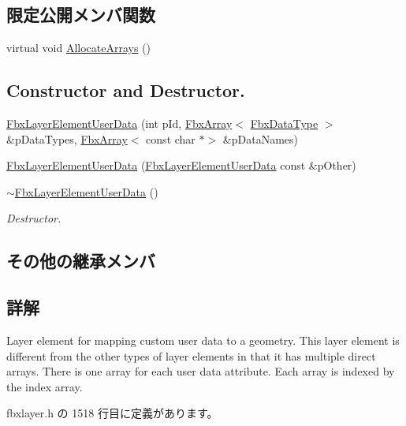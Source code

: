 \subsection*{限定公開メンバ関数}
\begin{DoxyCompactItemize}
\item 
virtual void \hyperlink{class_fbx_layer_element_user_data_afd9b9cec3547a1a5ccde15f274128d2a}{Allocate\+Arrays} ()
\end{DoxyCompactItemize}
\subsection*{Constructor and Destructor.}
\begin{DoxyCompactItemize}
\item 
\hyperlink{class_fbx_layer_element_user_data_a5f39fe7e33c61558f7b92b79c4c3f81b}{Fbx\+Layer\+Element\+User\+Data} (int p\+Id, \hyperlink{class_fbx_array}{Fbx\+Array}$<$ \hyperlink{class_fbx_data_type}{Fbx\+Data\+Type} $>$ \&p\+Data\+Types, \hyperlink{class_fbx_array}{Fbx\+Array}$<$ const char $\ast$$>$ \&p\+Data\+Names)
\item 
\hyperlink{class_fbx_layer_element_user_data_aa64b5222f1e7cb1091b92317b7516969}{Fbx\+Layer\+Element\+User\+Data} (\hyperlink{class_fbx_layer_element_user_data}{Fbx\+Layer\+Element\+User\+Data} const \&p\+Other)
\item 
\hyperlink{class_fbx_layer_element_user_data_a77cda3570c8b9d92d8c5360c008bdca2}{$\sim$\+Fbx\+Layer\+Element\+User\+Data} ()
\begin{DoxyCompactList}\small\item\em Destructor. \end{DoxyCompactList}\end{DoxyCompactItemize}
\subsection*{その他の継承メンバ}


\subsection{詳解}
Layer element for mapping custom user data to a geometry. This layer element is different from the other types of layer elements in that it has multiple direct arrays. There is one array for each user data attribute. Each array is indexed by the index array. 

 fbxlayer.\+h の 1518 行目に定義があります。



